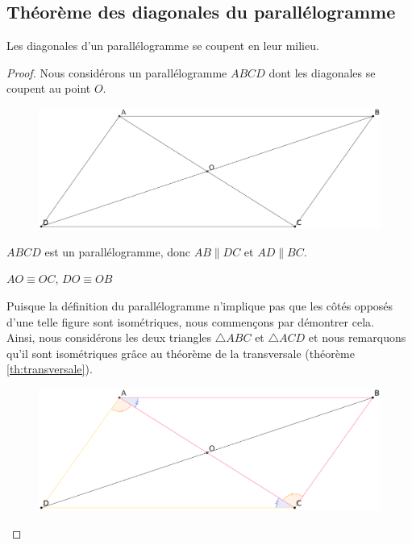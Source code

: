 \documentclass[a4paper,12pt]{article}
\begin{document}
\pagebreak
\subsection{Théorème des diagonales du parallélogramme}
\begin{theorem}\label{th:parallelogramme}
Les diagonales d'un parallélogramme se coupent en leur milieu.
\end{theorem}

\begin{proof}
Nous considérons un parallélogramme $ABCD$ dont les diagonales se coupent au point $O$.

\begin{figure}[H]
        \centering
        \includegraphics[scale=0.2]{parallelogram1.eps}
    \end{figure}
    
    
\begin{hyp}
$ABCD$ est un parallélogramme, donc $AB \parallel DC$ et $AD \parallel BC$.
\end{hyp}

\begin{concl}
$AO \equiv OC$, $DO \equiv OB$
\end{concl}
Puisque la définition du parallélogramme n'implique pas que les côtés opposés d'une telle figure sont isométriques, nous commençons par démontrer cela. \\
Ainsi, nous considérons les deux triangles $\triangle ABC$ et $\triangle ACD$ et nous remarquons qu'il sont isométriques grâce au théorème de la transversale (théorème \ref{th:transversale}).

\begin{figure}[H]
        \centering
        \includegraphics[scale=0.2]{parallelogram2.eps}
    \end{figure}


\end{proof}
\end{document}
